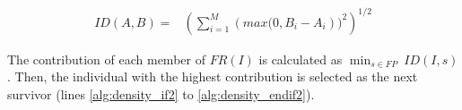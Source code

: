 \begin{equation} \label{eq:ImprovementDistance}
\begin{split}
 ID(A, B) = &  \left (\sum_{i=1}^M \left (max(0, B_i - A_i \right ))^2  \right)^{1/2}
\end{split}
\end{equation}

The contribution of each member of $FR (I)$ is calculated as $\displaystyle{\min_{s \in FP}\ ID(I, s)}$.
%
Then, the individual with the highest contribution is selected as the next survivor (lines \ref{alg:density_if2} 
to \ref{alg:density_endif2}).

